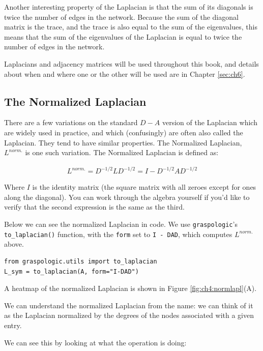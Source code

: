 Another interesting property of the Laplacian is that the sum of its diagonals is twice the number of edges in the network. Because the sum of the diagonal matrix is the trace, and the trace is also equal to the sum of the eigenvalues, this means that the sum of the eigenvalues of the Laplacian is equal to twice the number of edges in the network.

Laplacians and adjacency matrices will be used throughout this book, and details about when and where one or the other will be used are in Chapter \ref{sec:ch6}.

\subsection{The Normalized Laplacian}
\label{sec:ch4:mat-rep:normlapl}

There are a few variations on the standard $D-A$ version of the Laplacian which are widely used in practice, and which (confusingly) are often also called the Laplacian. They tend to have similar properties. The Normalized Laplacian, $L^{norm.}$ is one such variation. The Normalized Laplacian \cite{Chung1996Dec} is defined as:

\begin{align*}
    L^{norm.} = D^{-1/2} L D^{-1/2} = I - D^{-1/2} A D^{-1/2}
\end{align*}

Where $I$ is the identity matrix (the square matrix with all zeroes except for ones along the diagonal). You can work through the algebra yourself if you'd like to verify that the second expression is the same as the third.

Below we can see the normalized Laplacian in code. We use \texttt{graspologic}'s \texttt{to\_laplacian()} function, with the \texttt{form} set to \texttt{I - DAD}, which computes $L^{norm.}$ above.
 
\begin{lstlisting}[style=python]
from graspologic.utils import to_laplacian
L_sym = to_laplacian(A, form="I-DAD")
\end{lstlisting}
A heatmap of the normalized Laplacian is shown in Figure \ref{fig:ch4:normlapl}(A).

We can understand the normalized Laplacian from the name: we can think of it as the Laplacian normalized by the degrees of the nodes associated with a given entry.

We can see this by looking at what the operation is doing:

